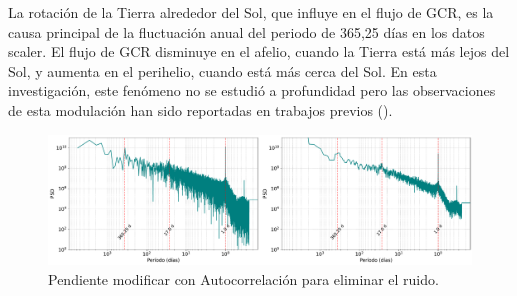 La rotación de la Tierra alrededor del Sol, que influye en el flujo de GCR, es la causa principal de la fluctuación anual del periodo de 365,25 días en los datos scaler. El flujo de GCR disminuye en el afelio, cuando la Tierra está más lejos del Sol, y aumenta en el perihelio, cuando está más cerca del Sol. En esta investigación, este fenómeno no se estudió a profundidad pero las observaciones de esta modulación han sido reportadas en trabajos previos (\cite{grieder_2001}).
\begin{figure}
\centering
\includegraphics[width=1\linewidth]{Figs/Figr/12_PSD_total.pdf}
    \caption{Pendiente modificar con Autocorrelación para eliminar el ruido.}
    \label{FFT1}
\end{figure}
